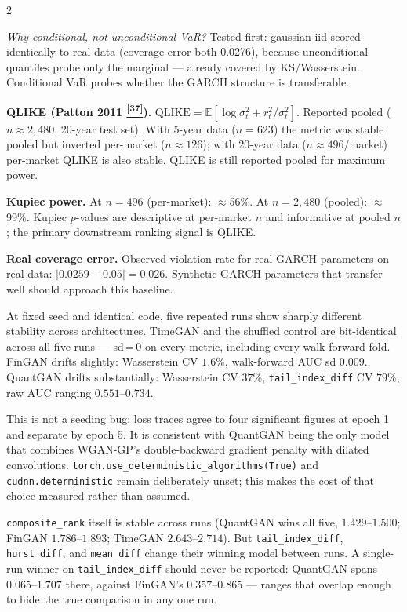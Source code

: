 \documentclass[10pt]{article}
\newcommand{\redbox}[2]{\begin{tcolorbox}[mybox={DRed}{RBg},title={#1}]#2\end{tcolorbox}}
\newcommand{\tcite}[1]{%
  \hyperlink{R:#1}{\textsuperscript{\scriptsize\textbf{[#1]}}}}
\newcommand{\E}{\mathbb{E}}
\begin{document}
\begin{multicols}{2}
{\textit{Why conditional, not unconditional VaR?} Tested first: gaussian iid scored identically to real data (coverage error both 0.0276), because unconditional quantiles probe only the marginal --- already covered by KS/Wasserstein. Conditional VaR probes whether the GARCH structure is transferable.

\textbf{QLIKE (Patton 2011\tcite{37}).} $\text{QLIKE} = \E[\log\sigma_t^2 + r_t^2/\sigma_t^2]$. Reported pooled ($n\approx2{,}480$, 20-year test set). With 5-year data ($n=623$) the metric was stable pooled but inverted per-market ($n\approx126$); with 20-year data ($n\approx496$/market) per-market QLIKE is also stable. QLIKE is still reported pooled for maximum power.

\textbf{Kupiec power.} At $n=496$ (per-market): $\approx$56\%. At $n=2{,}480$ (pooled): $\approx$99\%. Kupiec $p$-values are descriptive at per-market $n$ and informative at pooled $n$; the primary downstream ranking signal is QLIKE.

\textbf{Real coverage error.} Observed violation rate for real GARCH parameters on real data: $|0.0259 - 0.05| = 0.026$. Synthetic GARCH parameters that transfer well should approach this baseline.}

\redbox{Run-to-Run Nondeterminism at Fixed Seed}{%
At fixed seed and identical code, five repeated runs show sharply different stability across architectures. TimeGAN and the shuffled control are bit-identical across all five runs --- sd\,=\,0 on every metric, including every walk-forward fold. FinGAN drifts slightly: Wasserstein CV $1.6\%$, walk-forward AUC sd $0.009$. QuantGAN drifts substantially: Wasserstein CV $37\%$, \texttt{tail\_index\_diff} CV $79\%$, raw AUC ranging $0.551$--$0.734$.

This is not a seeding bug: loss traces agree to four significant figures at epoch 1 and separate by epoch 5. It is consistent with QuantGAN being the only model that combines WGAN-GP's double-backward gradient penalty with dilated convolutions. \texttt{torch.use\_deterministic\_algorithms(True)} and \texttt{cudnn.deterministic} remain deliberately unset; this makes the cost of that choice measured rather than assumed.

\texttt{composite\_rank} itself is stable across runs (QuantGAN wins all five, $1.429$--$1.500$; FinGAN $1.786$--$1.893$; TimeGAN $2.643$--$2.714$). But \texttt{tail\_index\_diff}, \texttt{hurst\_diff}, and \texttt{mean\_diff} change their winning model between runs. A single-run winner on \texttt{tail\_index\_diff} should never be reported: QuantGAN spans $0.065$--$1.707$ there, against FinGAN's $0.357$--$0.865$ --- ranges that overlap enough to hide the true comparison in any one run.}

\end{multicols}
\end{document}
